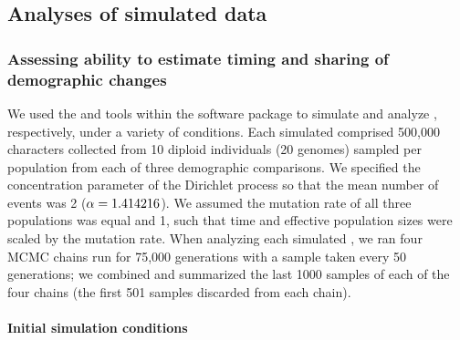 \subsection{Analyses of simulated data}

\subsubsection{Assessing ability to estimate timing and sharing of demographic changes}

We used the \simcoevolity and \ecoevolity tools within the \ecoevolity software
package to simulate and analyze \datasets,
respectively, under a variety of conditions.
Each simulated \dataset comprised 500,000 characters collected from 10 diploid
individuals (20 genomes) sampled per population from each of three demographic
comparisons.
We specified the concentration parameter of the Dirichlet process so that
the mean number of events was 2 ($\alpha = 1.414216$).
We assumed the mutation rate of all three populations was equal and 1, such
that time and effective population sizes were scaled by the mutation rate.
When analyzing each simulated \dataset, we ran four MCMC chains run for 75,000
generations with a sample taken every 50 generations; we combined and
summarized the last 1000 samples of each of the four chains (the first 501
samples discarded from each chain).

\paragraph{Initial simulation conditions}

